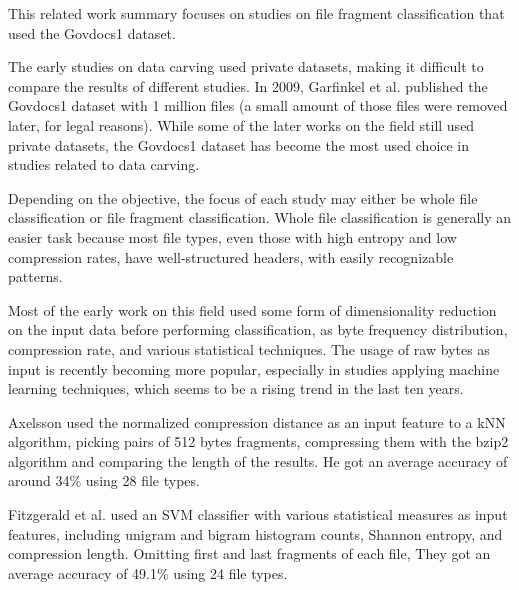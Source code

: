 This related work summary focuses on studies on file fragment classification that used the Govdocs1 dataset\cite{garfinkel_bringing_2009}.

The early studies on data carving used private datasets, making it difficult to compare the results of different studies. In 2009, Garfinkel et al. \cite{garfinkel_bringing_2009} published the Govdocs1 dataset with 1 million files (a small amount of those files were removed later, for legal reasons). While some of the later works on the field still used private datasets, the Govdocs1 dataset has become the most used choice in studies related to data carving.

Depending on the objective, the focus of each study may either be whole file classification or file fragment classification. Whole file classification is generally an easier task because most file types, even those with high entropy and low compression rates, have well-structured headers, with easily recognizable patterns.

Most of the early work on this field used some form of dimensionality reduction on the input data before performing classification, as byte frequency distribution, compression rate, and various statistical techniques. The usage of raw bytes as input is recently becoming more popular, especially in studies applying machine learning techniques, which seems to be a rising trend in the last ten years.


Axelsson \cite{axelsson_normalised_2010}
used the normalized compression distance as an input feature to a kNN algorithm,
picking pairs of 512 bytes fragments, compressing them with the bzip2 algorithm
and comparing the length of the results.
He got an average accuracy of around 34\% using 28 file types.


Fitzgerald et al. \cite{fitzgerald_using_2012}  
used an SVM classifier with various statistical measures as input features, including unigram and bigram histogram counts, Shannon entropy, and compression length.
Omitting first and last fragments of each file,
They got an average accuracy of 49.1\% using 24 file types.

